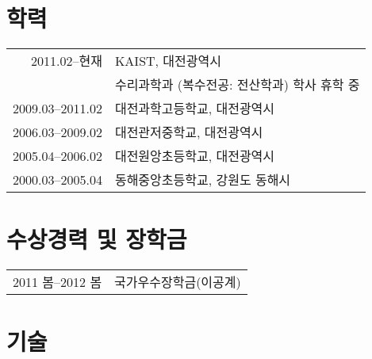 \documentclass[a4paper,10pt]{article}
\begin{document}
\section{학력}
\begin{tabular}{rl}
  2011.02--현재 & KAIST, 대전광역시 \\
  & \textsc{수리과학과} (복수전공: \textsc{전산학과}) 학사 휴학 중 \\
  2009.03--2011.02 & 대전과학고등학교, 대전광역시 \\
  2006.03--2009.02 & 대전관저중학교, 대전광역시 \\
  2005.04--2006.02 & 대전원앙초등학교, 대전광역시 \\
  2000.03--2005.04 & 동해중앙초등학교, 강원도 동해시
\end{tabular}

\section{수상경력 및 장학금}
\begin{tabular}{rl}
  2011 봄--2012 봄 & 국가우수장학금(이공계)
\end{tabular}

\section{기술}


\end{document}
